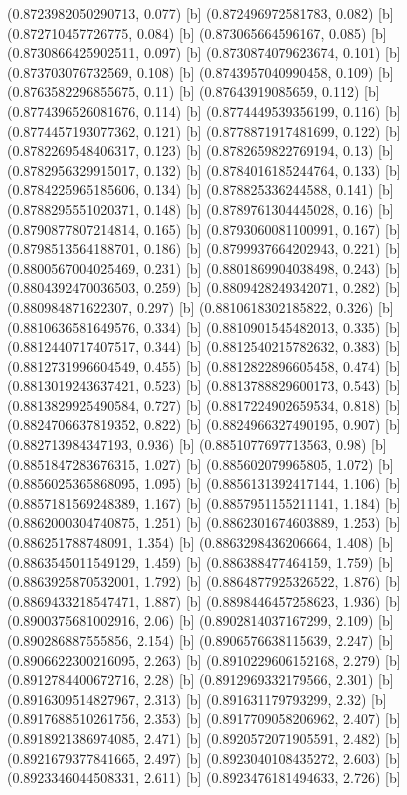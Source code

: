 {{{(0.8723982050290713, 0.077) [b] 
(0.872496972581783, 0.082) [b] 
(0.872710457726775, 0.084) [b] 
(0.873065664596167, 0.085) [b] 
(0.8730866425902511, 0.097) [b] 
(0.8730874079623674, 0.101) [b] 
(0.873703076732569, 0.108) [b] 
(0.8743957040990458, 0.109) [b] 
(0.8763582296855675, 0.11) [b] 
(0.87643919085659, 0.112) [b] 
(0.8774396526081676, 0.114) [b] 
(0.8774449539356199, 0.116) [b] 
(0.8774457193077362, 0.121) [b] 
(0.8778871917481699, 0.122) [b] 
(0.8782269548406317, 0.123) [b] 
(0.8782659822769194, 0.13) [b] 
(0.8782956329915017, 0.132) [b] 
(0.8784016185244764, 0.133) [b] 
(0.8784225965185606, 0.134) [b] 
(0.878825336244588, 0.141) [b] 
(0.8788295551020371, 0.148) [b] 
(0.8789761304445028, 0.16) [b] 
(0.8790877807214814, 0.165) [b] 
(0.8793060081100991, 0.167) [b] 
(0.8798513564188701, 0.186) [b] 
(0.8799937664202943, 0.221) [b] 
(0.8800567004025469, 0.231) [b] 
(0.8801869904038498, 0.243) [b] 
(0.8804392470036503, 0.259) [b] 
(0.8809428249342071, 0.282) [b] 
(0.880984871622307, 0.297) [b] 
(0.8810618302185822, 0.326) [b] 
(0.8810636581649576, 0.334) [b] 
(0.8810901545482013, 0.335) [b] 
(0.8812440717407517, 0.344) [b] 
(0.8812540215782632, 0.383) [b] 
(0.8812731996604549, 0.455) [b] 
(0.8812822896605458, 0.474) [b] 
(0.8813019243637421, 0.523) [b] 
(0.8813788829600173, 0.543) [b] 
(0.8813829925490584, 0.727) [b] 
(0.8817224902659534, 0.818) [b] 
(0.8824706637819352, 0.822) [b] 
(0.8824966327490195, 0.907) [b] 
(0.882713984347193, 0.936) [b] 
(0.8851077697713563, 0.98) [b] 
(0.8851847283676315, 1.027) [b] 
(0.885602079965805, 1.072) [b] 
(0.8856025365868095, 1.095) [b] 
(0.8856131392417144, 1.106) [b] 
(0.8857181569248389, 1.167) [b] 
(0.8857951155211141, 1.184) [b] 
(0.8862000304740875, 1.251) [b] 
(0.8862301674603889, 1.253) [b] 
(0.886251788748091, 1.354) [b] 
(0.8863298436206664, 1.408) [b] 
(0.8863545011549129, 1.459) [b] 
(0.886388477464159, 1.759) [b] 
(0.8863925870532001, 1.792) [b] 
(0.8864877925326522, 1.876) [b] 
(0.8869433218547471, 1.887) [b] 
(0.8898446457258623, 1.936) [b] 
(0.8900375681002916, 2.06) [b] 
(0.8902814037167299, 2.109) [b] 
(0.890286887555856, 2.154) [b] 
(0.8906576638115639, 2.247) [b] 
(0.8906622300216095, 2.263) [b] 
(0.8910229606152168, 2.279) [b] 
(0.8912784400672716, 2.28) [b] 
(0.8912969332179566, 2.301) [b] 
(0.8916309514827967, 2.313) [b] 
(0.891631179793299, 2.32) [b] 
(0.8917688510261756, 2.353) [b] 
(0.8917709058206962, 2.407) [b] 
(0.8918921386974085, 2.471) [b] 
(0.8920572071905591, 2.482) [b] 
(0.8921679377841665, 2.497) [b] 
(0.8923040108435272, 2.603) [b] 
(0.8923346044508331, 2.611) [b] 
(0.8923476181494633, 2.726) [b] 
}}}
